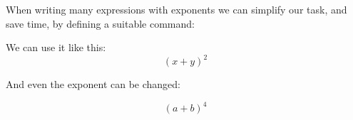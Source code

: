 When writing many expressions with exponents we can simplify our task, and save time, by defining a suitable command:

\newcommand{\plusbinomial}[3][2]{\ensuremath{(#2 + #3)^#1}}

We can use it like this: \[ \plusbinomial{x}{y} \]

And even the exponent can be changed:

\[ \plusbinomial[4]{a}{b} \]